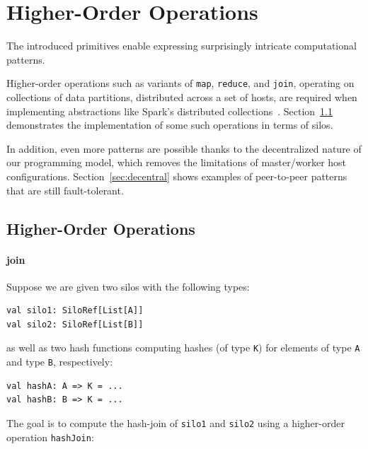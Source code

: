 \documentclass{jfp1}
\begin{document}
\section{Higher-Order Operations}
\label{sec:higher-order-operations}

The introduced primitives enable expressing surprisingly intricate
computational patterns.

Higher-order operations such as variants of \verb|map|, \verb|reduce|, and
\verb|join|, operating on collections of data partitions, distributed across a
set of hosts, are required when implementing abstractions like Spark's
distributed collections~\cite{Spark}. Section~\ref{sec:dist-coll} demonstrates
the implementation of some such operations in terms of silos.

In addition, even more patterns are possible thanks to the decentralized nature
of our programming model, which removes the limitations of master/worker host
configurations. Section~\ref{sec:decentral} shows examples of peer-to-peer
patterns that are still fault-tolerant.


\subsection{Higher-Order Operations}
\label{sec:dist-coll}

%

\paragraph{join}

Suppose we are given two silos with the following types:

\begin{lstlisting}
val silo1: SiloRef[List[A]]
val silo2: SiloRef[List[B]]
\end{lstlisting}
\noindent
as well as two hash functions computing hashes (of type \verb|K|) for elements
of type \verb|A| and type \verb|B|, respectively:

\begin{lstlisting}
val hashA: A => K = ...
val hashB: B => K = ...
\end{lstlisting}
\noindent
The goal is to compute the hash-join of \verb|silo1| and \verb|silo2| using a
higher-order operation \verb|hashJoin|:
\end{document}
